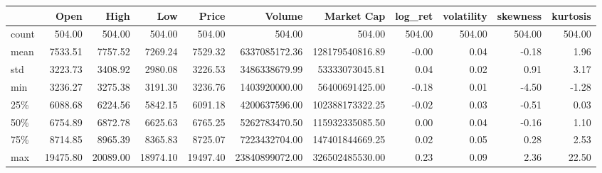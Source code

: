 \begin{tabular}{lrrrrrrrrrr}
\toprule
{} &     Open &     High &      Low &    Price &         Volume &      Market Cap &  log\_ret &  volatility &  skewness &  kurtosis \\
\midrule
count &   504.00 &   504.00 &   504.00 &   504.00 &         504.00 &          504.00 &   504.00 &      504.00 &    504.00 &    504.00 \\
mean  &  7533.51 &  7757.52 &  7269.24 &  7529.32 &  6337085172.36 & 128179540816.89 &    -0.00 &        0.04 &     -0.18 &      1.96 \\
std   &  3223.73 &  3408.92 &  2980.08 &  3226.53 &  3486338679.99 &  53333073045.81 &     0.04 &        0.02 &      0.91 &      3.17 \\
min   &  3236.27 &  3275.38 &  3191.30 &  3236.76 &  1403920000.00 &  56400691425.00 &    -0.18 &        0.01 &     -4.50 &     -1.28 \\
25\%   &  6088.68 &  6224.56 &  5842.15 &  6091.18 &  4200637596.00 & 102388173322.25 &    -0.02 &        0.03 &     -0.51 &      0.03 \\
50\%   &  6754.89 &  6872.78 &  6625.63 &  6765.25 &  5262783470.50 & 115932335085.50 &     0.00 &        0.04 &     -0.16 &      1.10 \\
75\%   &  8714.85 &  8965.39 &  8365.83 &  8725.07 &  7223432704.00 & 147401844669.25 &     0.02 &        0.05 &      0.28 &      2.53 \\
max   & 19475.80 & 20089.00 & 18974.10 & 19497.40 & 23840899072.00 & 326502485530.00 &     0.23 &        0.09 &      2.36 &     22.50 \\
\bottomrule
\end{tabular}
